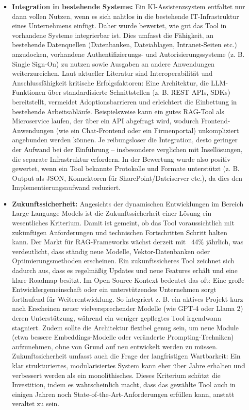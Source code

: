 \begin{itemize}
    \item \textbf{Integration in bestehende Systeme:} Ein KI-Assistenzsystem entfaltet nur dann vollen Nutzen, wenn es sich nahtlos in die bestehende IT-Infrastruktur eines Unternehmens einfügt. Daher wurde bewertet, wie gut das Tool in vorhandene Systeme integrierbar ist. Dies umfasst die Fähigkeit, an bestehende Datenquellen (Datenbanken, Dateiablagen, Intranet-Seiten etc.) anzudocken, vorhandene Authentifizierungs- und Autorisierungssysteme (z. B. Single Sign-On) zu nutzen sowie Ausgaben an andere Anwendungen weiterzureichen. Laut aktueller Literatur sind Interoperabilität und Anschlussfähigkeit kritische Erfolgsfaktoren: Eine Architektur, die LLM-Funktionen über standardisierte Schnittstellen (z. B. REST APIs, SDKs) bereitstellt, vermeidet Adoptionsbarrieren und erleichtert die Einbettung in bestehende Arbeitsabläufe. Beispielsweise kann ein gutes RAG-Tool als Microservice laufen, der über ein API abgefragt wird, wodurch Frontend-Anwendungen (wie ein Chat-Frontend oder ein Firmenportal) unkompliziert angebunden werden können. Je reibungsloser die Integration, desto geringer der Aufwand bei der Einführung – insbesondere verglichen mit Insellösungen, die separate Infrastruktur erfordern. In der Bewertung wurde also positiv gewertet, wenn ein Tool bekannte Protokolle und Formate unterstützt (z. B. Output als JSON, Konnektoren für SharePoint/Dateiserver etc.), da dies den Implementierungsaufwand reduziert.
    \item \textbf{Zukunftssicherheit:} Angesichts der dynamischen Entwicklungen im Bereich Large Language Models ist die Zukunftssicherheit einer Lösung ein wesentliches Kriterium. Damit ist gemeint, ob das Tool voraussichtlich mit zukünftigen Anforderungen und technischen Fortschritten Schritt halten kann. Der Markt für RAG-Frameworks wächst derzeit mit ~44\% jährlich, was verdeutlicht, dass ständig neue Modelle, Vektor-Datenbanken oder Optimierungsmethoden erscheinen. Ein zukunftssicheres Tool zeichnet sich dadurch aus, dass es regelmäßig Updates und neue Features erhält und eine klare Roadmap besitzt. Im Open-Source-Kontext bedeutet das oft: Eine große Entwicklergemeinschaft oder ein unterstützendes Unternehmen sorgt fortlaufend für Weiterentwicklung. So integriert z. B. ein aktives Projekt kurz nach Erscheinen neuer vielversprechender Modelle (wie GPT-4 oder Llama 2) deren Unterstützung, während ein weniger gepflegtes Tool irgendwann stagniert. Zudem sollte die Architektur flexibel genug sein, um neue Module (etwa bessere Embeddings-Modelle oder veränderte Prompting-Techniken) aufzunehmen, ohne von Grund auf neu entwickelt werden zu müssen. Zukunftssicherheit umfasst auch die Frage der langfristigen Wartbarkeit: Ein klar strukturiertes, modularisiertes System kann eher über Jahre erhalten und verbessert werden als ein monolithisches. Dieses Kriterium schützt die Investition, indem es wahrscheinlich macht, dass das gewählte Tool auch in einigen Jahren noch State-of-the-Art-Anforderungen erfüllen kann, anstatt veraltet zu sein.

\end{itemize}
